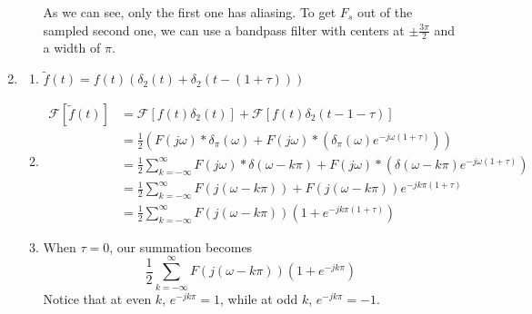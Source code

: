 \documentclass[12pt]{article}
\newcommand{\ft}[1]{\mathcal{F}\left[#1\right]}
\begin{document}
\begin{enumerate}
\begin{enumerate}
                        As we can see, only the first one has aliasing.
                        To get $F_s$ out of the sampled second one, we can use a bandpass
                        filter with centers at $\pm \frac{3\pi}{2}$ and a width of $\pi$.
            \end{enumerate}
      \item \begin{enumerate}
                  \item $\tilde{f}(t)=f(t)(\delta_2(t)+\delta_2(t-(1+\tau)))$
                  \item \[\begin{aligned}
                                    \ft{\tilde{f}(t)}
                                     & = \ft{f(t)\delta_2(t)}+\ft{f(t)\delta_2(t-1-\tau)}                                                                                           \\
                                     & = \frac{1}{2} \left(F(j\omega) * \delta_{\pi}(\omega)+F(j\omega) * \left(\delta_{\pi}(\omega)e^{-j\omega(1+\tau)}\right)\right)              \\
                                     & = \frac{1}{2} \sum_{k=-\infty}^{\infty} F(j\omega) * \delta(\omega-k\pi) + F(j\omega) * \left(\delta(\omega-k\pi)e^{-j\omega(1+\tau)}\right) \\
                                     & = \frac{1}{2} \sum_{k=-\infty}^{\infty} F(j(\omega-k\pi))+F(j(\omega-k\pi))e^{-jk\pi(1+\tau)}                                                \\
                                     & = \frac{1}{2} \sum_{k=-\infty}^{\infty} F(j(\omega-k\pi))\left(1+e^{-jk\pi(1+\tau)}\right)
                              \end{aligned}\] \label{list:2b}
                  \item When $\tau=0$, our summation becomes
                        \[\frac{1}{2} \sum_{k=-\infty}^{\infty} F(j(\omega-k\pi))\left(1+e^{-jk\pi}\right)\]
                        Notice that at even $k$, $e^{-jk\pi}=1$, while at odd $k$, $e^{-jk\pi}=-1$.


\end{enumerate}
\end{enumerate}
\end{document}
